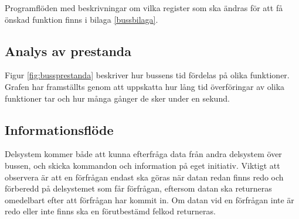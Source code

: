 Programflöden med beskrivningar om vilka register som ska ändras för att få önskad funktion finns i bilaga \ref{bussbilaga}.

\subsection{Analys av prestanda}
Figur \ref{fig:bussprestanda} beskriver hur bussens tid fördelas på olika funktioner. Grafen har framställts genom att uppskatta hur lång tid överföringar av olika funktioner tar och hur många gånger de sker under en sekund.


\subsection{Informationsflöde}

Delsystem kommer både att kunna efterfråga data från andra delsystem över bussen, och skicka kommandon och information på eget initiativ. Viktigt att observera är att en förfrågan endast ska göras när datan redan finns redo och förberedd på delsystemet som får förfrågan, eftersom datan ska returneras omedelbart efter att förfrågan har kommit in. Om datan vid en förfrågan inte är redo eller inte finns ska en förutbestämd felkod returneras.



